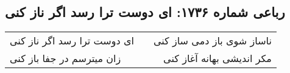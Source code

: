 \begin{center}
\section*{رباعی شماره ۱۷۳۶: ای دوست ترا رسد اگر ناز کنی}
\label{sec:1736}
\begin{longtable}{l p{0.5cm} r}
ای دوست ترا رسد اگر ناز کنی
&&
ناساز شوی باز دمی ساز کنی
\\
زان میترسم در جفا باز کنی
&&
مکر اندیشی بهانه آغاز کنی
\\
\end{longtable}
\end{center}
